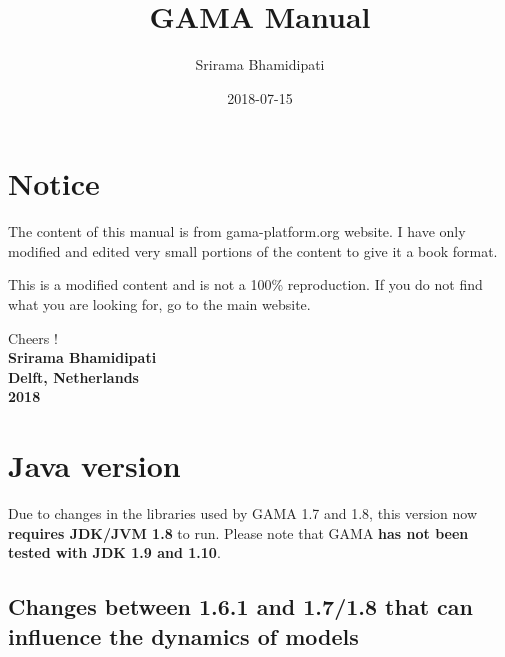 \documentclass[]{book}
\title{GAMA Manual}
\author{Srirama Bhamidipati}
\date{2018-07-15}
\theoremstyle{definition}
\theoremstyle{definition}
\theoremstyle{definition}
\theoremstyle{remark}
\begin{document}
\maketitle

{
\setcounter{tocdepth}{1}
\tableofcontents
}
\chapter*{Notice}\label{notice}

The content of this manual is from gama-platform.org website. I have
only modified and edited very small portions of the content to give it a
book format.

This is a modified content and is not a 100\% reproduction. If you do
not find what you are looking for, go to the main website.

Cheers !\\
\textbf{Srirama Bhamidipati}\\
\textbf{Delft, Netherlands}\\
\textbf{2018}

\chapter{Java version}\label{java-version}

Due to changes in the libraries used by GAMA 1.7 and 1.8, this version
now \textbf{requires JDK/JVM 1.8} to run. Please note that GAMA
\textbf{has not been tested with JDK 1.9 and 1.10}.

\section{Changes between 1.6.1 and 1.7/1.8 that can influence the
dynamics of
models}\label{changes-between-1.6.1-and-1.71.8-that-can-influence-the-dynamics-of-models}
\end{document}
